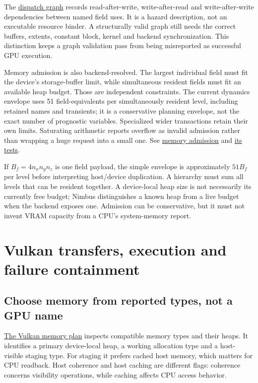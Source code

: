 The \href{../include/compute/dispatch_graph.hpp}{dispatch graph} records
read-after-write, write-after-read and write-after-write dependencies between
named field uses. It is a hazard description, not an executable resource
binder. A structurally valid graph still needs the correct buffers, extents,
constant block, kernel and backend synchronization. This distinction keeps a
graph validation pass from being misreported as successful GPU execution.

Memory admission is also backend-resolved. The largest individual field must
fit the device's storage-buffer limit, while simultaneous resident fields
must fit an available heap budget. Those are independent constraints. The
current dynamics envelope uses 51 field-equivalents per simultaneously resident
level, including retained names and transients; it is a conservative planning
envelope, not the exact number of prognostic variables. Specialized wider
transactions retain their own limits. Saturating arithmetic reports overflow
as invalid admission rather than wrapping a huge request into a small one.
See \href{../include/compute/compute_memory_admission.hpp}{memory admission}
and \href{../tests/compute/test_memory_admission.cpp}{its tests}.

If $B_f=4n_xn_yn_z$ is one field payload, the simple envelope is approximately
$51B_f$ per level before interpreting host/device duplication. A hierarchy
must sum all levels that can be resident together. A device-local heap size is
not necessarily its currently free budget; Nimbus distinguishes a known heap
from a live budget when the backend exposes one. Admission can be conservative,
but it must not invent VRAM capacity from a CPU's system-memory report.

\section{Vulkan transfers, execution and failure containment}
\label{architecture-vulkan}

\subsection{Choose memory from reported types, not a GPU name}

\href{../vulkan/include/compute/vulkan_memory_plan.hpp}{The Vulkan memory plan}
inspects compatible memory types and their heaps. It identifies a primary
device-local heap, a working allocation type and a host-visible staging type.
For staging it prefers cached host memory, which matters for CPU readback.
Host coherence and host caching are different flags: coherence concerns
visibility operations, while caching affects CPU access behavior.

